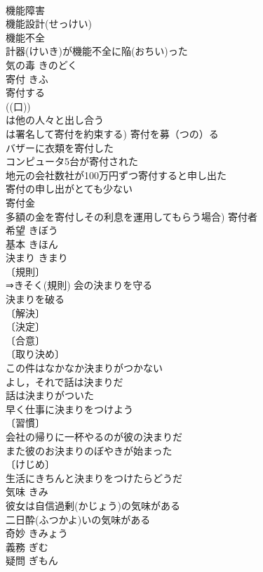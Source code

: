 \documentclass[8pt]{extreport}
\begin{document}
\begin{CJK}{UTF8}{min}
\\	機能障害 
\\	機能設計(せっけい) 
\\	機能不全 
\\	計器(けいき)が機能不全に陥(おちい)った 
\\	気の毒	きのどく	
\\	寄付	きふ	
\\	寄付する 
\\	((口)) 
\\	は他の人々と出し合う
\\	は署名して寄付を約束する) 寄付を募（つの）る 
\\	バザーに衣類を寄付した 
\\	コンピュータ5台が寄付された 
\\	地元の会社数社が100万円ずつ寄付すると申し出た 
\\	寄付の申し出がとても少ない 
\\	寄付金 
\\	多額の金を寄付しその利息を運用してもらう場合) 寄付者 
\\	希望	きぼう	
\\	基本	きほん	
\\	決まり	きまり	
\\	〔規則〕
\\	⇒きそく(規則) 会の決まりを守る 
\\	決まりを破る 
\\	〔解決〕
\\	〔決定〕
\\	〔合意〕
\\	〔取り決め〕
\\	この件はなかなか決まりがつかない 
\\	よし，それで話は決まりだ 
\\	話は決まりがついた 
\\	早く仕事に決まりをつけよう 
\\	〔習慣〕
\\	会社の帰りに一杯やるのが彼の決まりだ 
\\	また彼のお決まりのぼやきが始まった 
\\	〔けじめ〕
\\	生活にきちんと決まりをつけたらどうだ 
\\	気味	きみ	
\\	彼女は自信過剰(かじょう)の気味がある 
\\	二日酔(ふつかよ)いの気味がある 
\\	奇妙	きみょう	
\\	義務	ぎむ	
\\	疑問	ぎもん	

\end{CJK}
\end{document}
